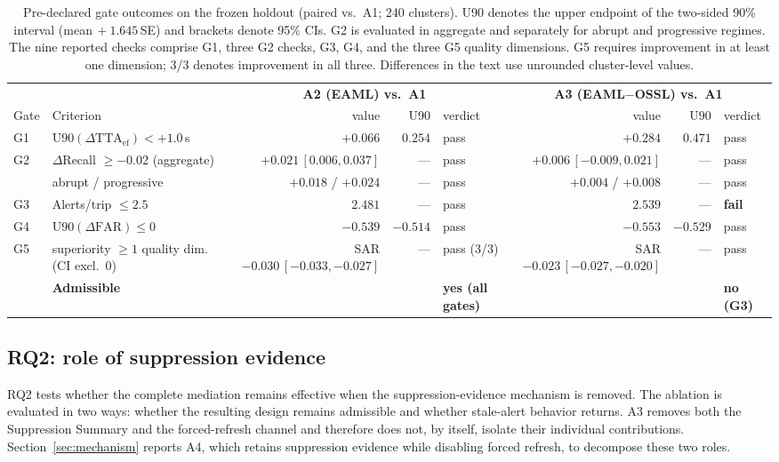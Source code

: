 \documentclass[conference]{IEEEtran}
\newcommand{\ttaef}{\mathrm{TTA}_{\mathrm{ef}}}
\begin{document}
\begin{table}[!t]
\caption{Pre-declared gate outcomes on the frozen holdout (paired vs.\
A1; 240 clusters). U90 denotes the upper endpoint of the two-sided
90\% interval (mean$\,+1.645\,$SE) and brackets denote 95\% CIs. G2 is evaluated in aggregate and separately
for abrupt and progressive regimes. The nine reported checks comprise
G1, three G2 checks, G3, G4, and the three G5 quality dimensions.
G5 requires improvement in at least one dimension; 3/3 denotes
improvement in all three. Differences in the text use unrounded
cluster-level values.}
\label{tab:gates}
\centering\scriptsize
\setlength{\tabcolsep}{4pt}
\begin{tabular}{@{}llrrl@{\quad}rrl@{}}
\toprule
 & & \multicolumn{3}{c}{\textbf{A2 (EAML) vs.\ A1}} &
 \multicolumn{3}{c}{\textbf{A3 (EAML$-$OSSL) vs.\ A1}}\\
\cmidrule(lr){3-5}\cmidrule(l){6-8}
Gate & Criterion & value & U90 & verdict & value & U90 & verdict\\
\midrule
G1 & $\mathrm{U90}(\Delta\ttaef)<+1.0$\,s &
 $+0.066$ & $0.254$ & pass &
 $+0.284$ & $0.471$ & pass\\
G2 & $\Delta$Recall $\geq-0.02$ (aggregate) &
 $+0.021\,[0.006,0.037]$ & --- & pass &
 $+0.006\,[-0.009,0.021]$ & --- & pass\\
 & \quad abrupt / progressive &
 $+0.018$ / $+0.024$ & --- & pass &
 $+0.004$ / $+0.008$ & --- & pass\\
G3 & Alerts/trip $\leq 2.5$ &
 $2.481$ & --- & pass &
 $2.539$ & --- & \textbf{fail}\\
G4 & $\mathrm{U90}(\Delta\mathrm{FAR})\leq 0$ &
 $-0.539$ & $-0.514$ & pass &
 $-0.553$ & $-0.529$ & pass\\
G5 & superiority $\geq1$ quality dim. (CI excl.\ 0) &
 SAR $-0.030\,[-0.033,-0.027]$ & --- & pass (3/3) &
 SAR $-0.023\,[-0.027,-0.020]$ & --- & pass\\
\midrule
 & \textbf{Admissible} & & & \textbf{yes (all gates)} & & &
 \textbf{no (G3)}\\
\bottomrule
\end{tabular}
\end{table}

\subsection{RQ2: role of suppression evidence}

RQ2 tests whether the complete mediation remains effective when the
suppression-evidence mechanism is removed. The ablation is evaluated in
two ways: whether the resulting design remains admissible and whether
stale-alert behavior returns. A3 removes both the Suppression Summary
and the forced-refresh channel and therefore does not, by itself,
isolate their individual contributions. Section~\ref{sec:mechanism}
reports A4, which retains suppression evidence while disabling forced
refresh, to decompose these two roles.
\end{document}
